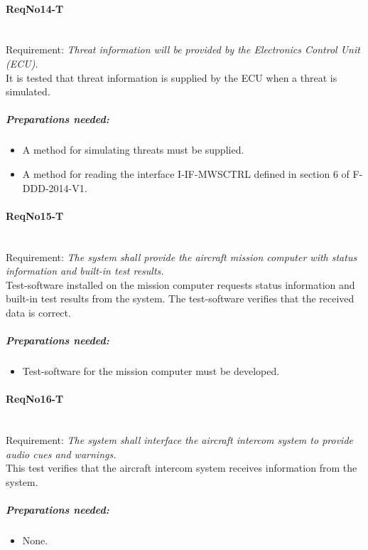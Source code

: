 \paragraph{ReqNo14-T}\mbox{}\\ %
Requirement: \textit{Threat information will be provided by the Electronics Control Unit (ECU).}
\\
It is tested that threat information is supplied by the ECU when a threat is simulated.

	\subparagraph{Preparations needed:}
	\begin{itemize}
	\item A method for simulating threats must be supplied.
	\item A method for reading the interface I-IF-MWSCTRL defined in section 6 of F-DDD-2014-V1.
	\end{itemize} 


\paragraph{ReqNo15-T}\mbox{}\\ %
Requirement: \textit{The system shall provide the aircraft mission computer
with status information and built-in test results.}
\\
Test-software installed on the mission computer requests status information and built-in test results from the system. The test-software verifies that the received data is correct.
\\
	\subparagraph{Preparations needed:}
	\begin{itemize}
	\item Test-software for the mission computer must be developed.
	\end{itemize} 

\paragraph{ReqNo16-T}\mbox{}\\ %
Requirement: \textit{The system shall interface the aircraft intercom system to provide audio cues and warnings.}
\\
This test verifies that the aircraft intercom system receives information from the system.
\\
	\subparagraph{Preparations needed:}
	\begin{itemize}
	\item None.
	\end{itemize} 


